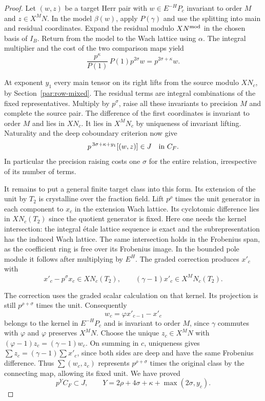\begin{proof}
Let \((w,z)\) be a target Herr pair with \(w\in E^{-H}P_c\)
invariant to order \(M\) and \(z\in X^MN\). In the model
\(\beta(w)\), apply \(P(\gamma)\) and use the splitting into
main and residual coordinates. Expand the residual modulo
\(XN^{\rm mod}\) in the chosen basis of \(I_B\).
Return from the model to the Wach lattice using \(\alpha\). The integral multiplier and the cost of the two comparison maps yield
\[
 \frac{p^\kappa}{P(1)}\,P(1)p^{2\sigma}w=p^{2\sigma+\kappa}w.
\]

At exponent \(y_1\) every main tensor on its right lifts from
the source modulo \(XN_c\), by Section~\ref{par:row-mixed}.
The residual terms are integral combinations of the fixed
representatives. Multiply by \(p^\sigma\), raise all these
invariants to precision \(M\) and complete the source pair.
The difference of the first coordinates is invariant to order \(M\)
and lies in \(XN_c\). It lies in \(X^MN_c\) by uniqueness of
invariant lifting. Naturality and the deep coboundary criterion now give
\[
              p^{\,3\sigma+\kappa+y_1}[(w,z)]\in J
                       \quad\hbox{in } C_F .
\]
In particular the precision raising costs one \(\sigma\) for the
entire relation, irrespective of its number of terms.

It remains to put a general finite target class into this form.
Its extension of the unit by \(T_2\) is crystalline over the fraction
field. Lift \(p^\rho\) times the unit generator in each component
to \(x_c\) in the extension Wach lattice. Its cyclotomic difference
lies in \(XN_c(T_2)\) since the quotient generator is fixed.
Here one needs the kernel intersection: the integral étale lattice
sequence is exact and the subrepresentation has the induced Wach
lattice. The same intersection holds in the Frobenius span, as the
coefficient ring is free over its Frobenius image. In the bounded
pole module it follows after multiplying by \(E^H\).
The graded correction produces \(x'_c\) with
\[
 x'_c-p^\sigma x_c\in XN_c(T_2),\qquad (\gamma-1)x'_c\in X^M N_c(T_2).
\]

The correction uses the graded scalar calculation on that kernel.
Its projection is still \(p^{\rho+\sigma}\) times the unit.
Consequently
\[
                        w_c=\varphi x'_{c-1}-x'_c
\]
belongs to the kernel in \(E^{-H}P_c\) and is invariant to order
\(M\), since \(\gamma\) commutes with \(\varphi\) and \(\varphi\)
preserves \(X^MN\). Choose the unique \(z_c\in X^MN\) with
\((\varphi-1)z_c=(\gamma-1)w_c\). On summing in \(c\), uniqueness
gives \(\sum z_c=(\gamma-1)\sum x'_c\), since both sides are deep
and have the same Frobenius difference. Thus
\(\sum(w_c,z_c)\) represents \(p^{\rho+\sigma}\) times the original
class by the connecting map, allowing its fixed unit. We have proved
\[
       p^Y C_F\subset J,\qquad
       Y=2\rho+4\sigma+\kappa+\max(2\sigma,y_c).
       \tag{R0}\label{eq:tag-r0}
\]


\end{proof}
